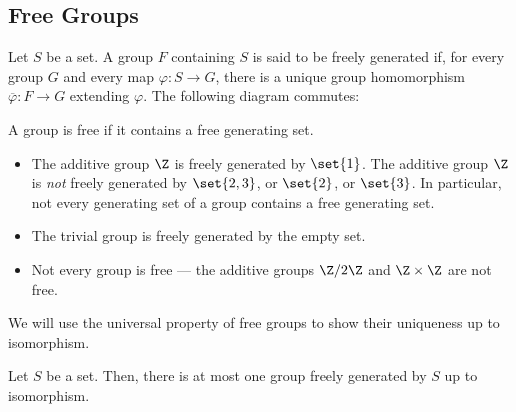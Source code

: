 \documentclass[10pt]{mypackage}
\begin{document}
\subsection{Free Groups}%
\begin{definition}
Let $S$ be a set. A group $F$ containing $S$ is said to be freely generated if, for every group $G$ and every map $\varphi\colon S\rightarrow G$, there is a unique group homomorphism $\overline{\varphi}:F\rightarrow G$ extending $\varphi$. The following diagram commutes:
\begin{center}
\end{center}
A group is free if it contains a free generating set.
\end{definition}
\begin{example}\hfill
  \begin{itemize}
    \item The additive group $\Z$ is freely generated by $\set{1}$. The additive group $\Z$ is \textit{not} freely generated by $\set{2,3}$, or $\set{2}$, or $\set{3}$. In particular, not every generating set of a group contains a free generating set.
    \item The trivial group is freely generated by the empty set.
    \item Not every group is free --- the additive groups $\Z/2\Z$ and $\Z\times \Z$ are not free.
  \end{itemize}
\end{example}
We will use the universal property of free groups to show their uniqueness up to isomorphism.
\begin{proposition}
  Let $S$ be a set. Then, there is at most one group freely generated by $S$ up to isomorphism.
\end{proposition}
\end{document}
